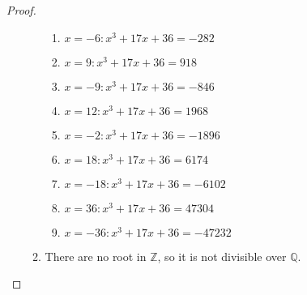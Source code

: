 \documentclass{article}
\begin{document}
\begin{proof}
\begin{enumerate}
\begin{enumerate}
\begin{enumerate}
            \item $x=-6:x^3+17x+36=-282$
            \item $x=9:x^3+17x+36=918$
            \item $x=-9:x^3+17x+36=-846$
            \item $x=12:x^3+17x+36=1968$
            \item $x=-2:x^3+17x+36=-1896$
            \item $x=18:x^3+17x+36=6174$
            \item $x=-18:x^3+17x+36=-6102$
            \item $x=36:x^3+17x+36=47304$
            \item $x=-36:x^3+17x+36=-47232$
        \end{enumerate}
        \item There are no root in $\mathbb{Z}$, so it is not divisible over $\mathbb{Q}$.
    \end{enumerate}
\end{enumerate}
\end{proof}
\end{document}
